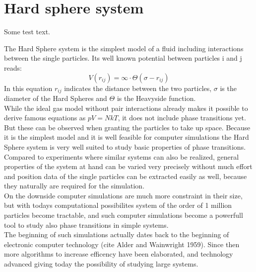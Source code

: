 
\label{chp:theory}

\section{Hard sphere system}
\label{sec:HS_system}
Some test text.

The Hard Sphere system is the simplest model of a fluid including interactions between the single particles. Its well known potential between particles i and j reads:
\begin{equation}
V(r_{ij})=\infty \cdot \Theta(\sigma - r_{ij})
\end{equation}
In this equation $r_{ij}$ indicates the distance between the two particles, $\sigma$ is the diameter of the Hard Spheres and $\Theta$ is the Heavyside function.\\
While the ideal gas model without pair interactions already makes it possible to derive famous equations as $pV=NkT$, it does not include phase transitions yet. But these can be observed when granting the particles to take up space. Because it is the simplest model and it is well feasible for computer simulations the Hard Sphere system is very well suited to study basic properties of phase transitions.\\ 

Compared to experiments where similar systems can also be realized, general properties of the system at hand can be varied very precisely without much effort and position data of the single particles can be extracted easily as well, because they naturally are required for the simulation.\\

On the downside computer simulations are much more constraint in their size, but with todays computational possibilites system of the order of 1 million particles become tractable, and such computer simulations become a powerfull tool to study also phase transitions in simple systems.\\

The beginning of such simulations actually dates back to the beginning of electronic computer technology (cite Alder and Wainwright 1959). Since then more algorithms to increase efficency have been elaborated, and technology advanced giving today the possibility of studying large systems. 

